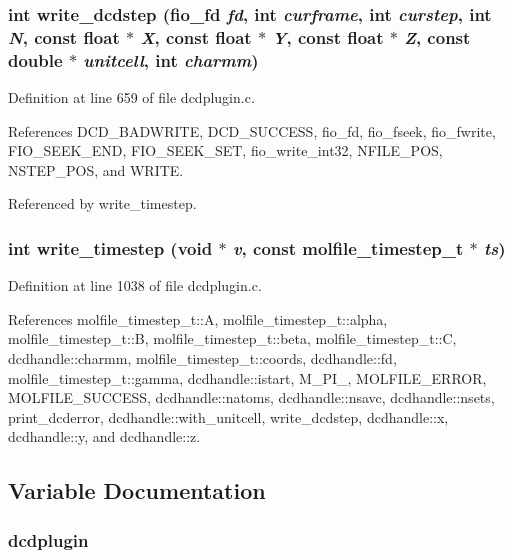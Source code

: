 \subsubsection{\setlength{\rightskip}{0pt plus 5cm}int write\_\-dcdstep ({\bf fio\_\-fd} {\em fd}, int {\em curframe}, int {\em curstep}, int {\em N}, const float $\ast$ {\em X}, const float $\ast$ {\em Y}, const float $\ast$ {\em Z}, const double $\ast$ {\em unitcell}, int {\em charmm})\hspace{0.3cm}{\tt  [static]}}\label{dcdplugin_8c_a32}




Definition at line 659 of file dcdplugin.c.

References DCD\_\-BADWRITE, DCD\_\-SUCCESS, fio\_\-fd, fio\_\-fseek, fio\_\-fwrite, FIO\_\-SEEK\_\-END, FIO\_\-SEEK\_\-SET, fio\_\-write\_\-int32, NFILE\_\-POS, NSTEP\_\-POS, and WRITE.

Referenced by write\_\-timestep.
\subsubsection{\setlength{\rightskip}{0pt plus 5cm}int write\_\-timestep (void $\ast$ {\em v}, const {\bf molfile\_\-timestep\_\-t} $\ast$ {\em ts})\hspace{0.3cm}{\tt  [static]}}\label{dcdplugin_8c_a39}




Definition at line 1038 of file dcdplugin.c.

References molfile\_\-timestep\_\-t::A, molfile\_\-timestep\_\-t::alpha, molfile\_\-timestep\_\-t::B, molfile\_\-timestep\_\-t::beta, molfile\_\-timestep\_\-t::C, dcdhandle::charmm, molfile\_\-timestep\_\-t::coords, dcdhandle::fd, molfile\_\-timestep\_\-t::gamma, dcdhandle::istart, M\_\-PI\_, MOLFILE\_\-ERROR, MOLFILE\_\-SUCCESS, dcdhandle::natoms, dcdhandle::nsavc, dcdhandle::nsets, print\_\-dcderror, dcdhandle::with\_\-unitcell, write\_\-dcdstep, dcdhandle::x, dcdhandle::y, and dcdhandle::z.

\subsection{Variable Documentation}
\subsubsection{ dcdplugin\hspace{0.3cm}{\tt  [static]}}\label{dcdplugin_8c_a24}


